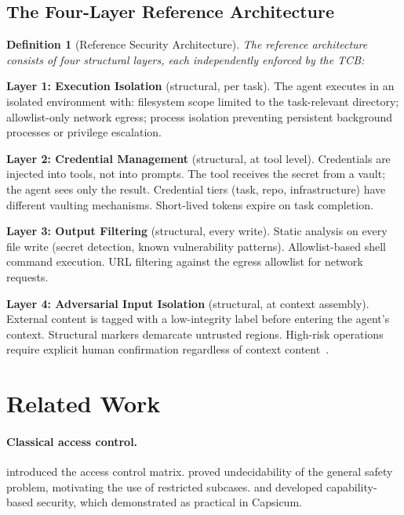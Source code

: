 \documentclass[11pt, a4paper, copyright]{googledeepmind}
\newtheorem{definition}{Definition}[section]
\begin{document}
\subsection{The Four-Layer Reference Architecture}

\begin{definition}[Reference Security Architecture]
The reference architecture consists of four structural layers, each independently enforced by the TCB:
\end{definition}

\textbf{Layer 1: Execution Isolation} (structural, per task). The agent executes in an isolated environment with: filesystem scope limited to the task-relevant directory; allowlist-only network egress; process isolation preventing persistent background processes or privilege escalation.

\textbf{Layer 2: Credential Management} (structural, at tool level). Credentials are injected into tools, not into prompts. The tool receives the secret from a vault; the agent sees only the result. Credential tiers (task, repo, infrastructure) have different vaulting mechanisms. Short-lived tokens expire on task completion.

\textbf{Layer 3: Output Filtering} (structural, every write). Static analysis on every file write (secret detection, known vulnerability patterns). Allowlist-based shell command execution. URL filtering against the egress allowlist for network requests.

\textbf{Layer 4: Adversarial Input Isolation} (structural, at context assembly). External content is tagged with a low-integrity label before entering the agent's context. Structural markers demarcate untrusted regions. High-risk operations require explicit human confirmation regardless of context content~\citep{pillar-human-interaction}.


\section{Related Work}
\label{sec:related}

\paragraph{Classical access control.}
\citet{lampson1971protection} introduced the access control matrix. \citet{harrison1976protection} proved undecidability of the general safety problem, motivating the use of restricted subcases. \citet{dennis1966programming} and \citet{miller2006robust} developed capability-based security, which \citet{watson2010capsicum} demonstrated as practical in Capsicum.
\end{document}
